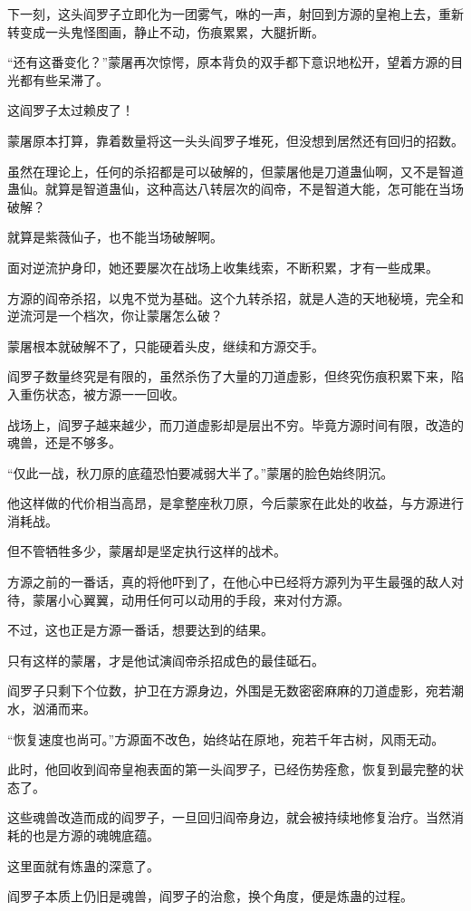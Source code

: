 \begin{this_body}
下一刻，这头阎罗子立即化为一团雾气，咻的一声，射回到方源的皇袍上去，重新转变成一头鬼怪图画，静止不动，伤痕累累，大腿折断。

“还有这番变化？”蒙屠再次惊愕，原本背负的双手都下意识地松开，望着方源的目光都有些呆滞了。

这阎罗子太过赖皮了！

蒙屠原本打算，靠着数量将这一头头阎罗子堆死，但没想到居然还有回归的招数。

虽然在理论上，任何的杀招都是可以破解的，但蒙屠他是刀道蛊仙啊，又不是智道蛊仙。就算是智道蛊仙，这种高达八转层次的阎帝，不是智道大能，怎可能在当场破解？

就算是紫薇仙子，也不能当场破解啊。

面对逆流护身印，她还要屡次在战场上收集线索，不断积累，才有一些成果。

方源的阎帝杀招，以鬼不觉为基础。这个九转杀招，就是人造的天地秘境，完全和逆流河是一个档次，你让蒙屠怎么破？

蒙屠根本就破解不了，只能硬着头皮，继续和方源交手。

阎罗子数量终究是有限的，虽然杀伤了大量的刀道虚影，但终究伤痕积累下来，陷入重伤状态，被方源一一回收。

战场上，阎罗子越来越少，而刀道虚影却是层出不穷。毕竟方源时间有限，改造的魂兽，还是不够多。

“仅此一战，秋刀原的底蕴恐怕要减弱大半了。”蒙屠的脸色始终阴沉。

他这样做的代价相当高昂，是拿整座秋刀原，今后蒙家在此处的收益，与方源进行消耗战。

但不管牺牲多少，蒙屠却是坚定执行这样的战术。

方源之前的一番话，真的将他吓到了，在他心中已经将方源列为平生最强的敌人对待，蒙屠小心翼翼，动用任何可以动用的手段，来对付方源。

不过，这也正是方源一番话，想要达到的结果。

只有这样的蒙屠，才是他试演阎帝杀招成色的最佳砥石。

阎罗子只剩下个位数，护卫在方源身边，外围是无数密密麻麻的刀道虚影，宛若潮水，汹涌而来。

“恢复速度也尚可。”方源面不改色，始终站在原地，宛若千年古树，风雨无动。

此时，他回收到阎帝皇袍表面的第一头阎罗子，已经伤势痊愈，恢复到最完整的状态了。

这些魂兽改造而成的阎罗子，一旦回归阎帝身边，就会被持续地修复治疗。当然消耗的也是方源的魂魄底蕴。

这里面就有炼蛊的深意了。

阎罗子本质上仍旧是魂兽，阎罗子的治愈，换个角度，便是炼蛊的过程。


\end{this_body}
